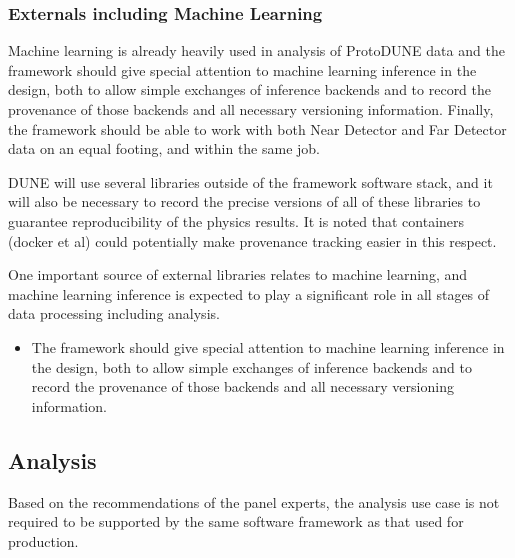 \documentclass[../main-v1.tex]{subfiles}
\begin{document}
\subsubsection{Externals including Machine Learning}
Machine learning is already heavily used in analysis of ProtoDUNE data and the framework should give special attention to machine learning inference in the design, both to allow simple exchanges of inference backends and to record the provenance of those backends and all necessary versioning information.  Finally, the framework should be able to work with both Near Detector and Far Detector data on an equal footing, and within the same job.

DUNE will use several libraries outside of the framework software stack, and it will also be necessary to record the precise versions of all of these libraries to guarantee reproducibility of the physics results.  It is noted that containers (docker et al) could potentially make provenance tracking easier in this respect.  



One important source of external libraries relates to machine learning, and machine learning inference is expected to play a significant role in all stages of data processing including analysis.  

\begin{itemize}
\item The framework should give special attention to machine learning inference in the design, both to allow simple exchanges of inference backends and to record the provenance of those backends and all necessary versioning information.



\end{itemize}


\subsection{Analysis}

Based on the recommendations of the  panel experts, the analysis use case is not required to be supported by the same software framework as that used for production.
\end{document}
